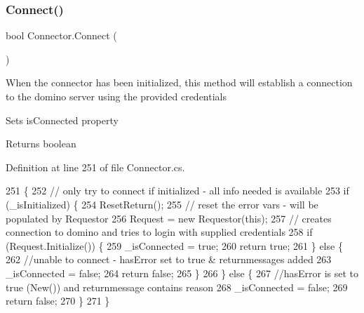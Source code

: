 \subsubsection{\texorpdfstring{Connect()}{Connect()}}
{\footnotesize\ttfamily bool Connector.\+Connect (\begin{DoxyParamCaption}{ }\end{DoxyParamCaption})}



When the connector has been initialized, this method will establish a connection to the domino server using the provided credentials 

Sets is\+Connected property

\begin{DoxyReturn}{Returns}
boolean
\end{DoxyReturn}


Definition at line 251 of file Connector.\+cs.


\begin{DoxyCode}
251                           \{
252         \textcolor{comment}{// only try to connect if initialized - all info needed is available}
253         \textcolor{keywordflow}{if} (\_isInitialized) \{
254             ResetReturn();
255             \textcolor{comment}{// reset the error vars - will be populated by Requestor}
256             Request = \textcolor{keyword}{new} Requestor(\textcolor{keyword}{this});
257             \textcolor{comment}{// creates connection to domino and tries to login with supplied credentials}
258             \textcolor{keywordflow}{if} (Request.Initialize()) \{
259                 \_isConnected = \textcolor{keyword}{true};
260                 \textcolor{keywordflow}{return} \textcolor{keyword}{true};
261             \} \textcolor{keywordflow}{else} \{
262                 \textcolor{comment}{//unable to connect - hasError set to true & returnmessages added}
263                 \_isConnected = \textcolor{keyword}{false};
264                 \textcolor{keywordflow}{return} \textcolor{keyword}{false};
265             \}
266         \} \textcolor{keywordflow}{else} \{
267             \textcolor{comment}{//hasError is set to true (New()) and returnmessage contains reason}
268             \_isConnected = \textcolor{keyword}{false};
269             \textcolor{keywordflow}{return} \textcolor{keyword}{false};
270         \}
271     \}
\end{DoxyCode}
\mbox{\label{class_connector_a5d089c1639f255966f00b2b05add0993}} 

